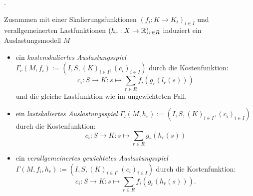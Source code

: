 \begin{bsp}.
	
\end{bsp}

\begin{defn}\label{def:skalierteAuslastungsspiel}
	Zusammen mit einer Skalierungsfunktionen $(f_i: K \to K_i)_{i\in I}$ und verallgemeinerten Lastfunktionen $(h_r: X \to \mathbb{R})_{r\in R}$ induziert ein Auslastungsmodell $M$ 
	\begin{itemize}
		\item ein \emph{kostenskaliertes Auslastungsspiel} $\Gamma_c(M, f_i) := (I, S, (K)_{i\in I}, (c_i)_{i \in I})$ durch die Kostenfunktion:
		\[c_i: S \to K: s \mapsto \sum_{r \in R} f_i(g_r(l_r(s))) \]
		und die gleiche Lastfunktion wie im ungewichteten Fall.
		\item ein \emph{lastskaliertes Auslastungsspiel} $\Gamma_l(M, h_r) := (I, S, (K)_{i\in I}, (c_i)_{i \in I})$ durch die Kostenfunktion:
		\[c_i: S \to K: s \mapsto \sum_{r \in R} g_r(h_r(s)) \]
		\item ein \emph{verallgemeinertes gewichtetes Auslastungsspiel} $\Gamma(M, f_i, h_r) := (I, S, (K)_{i\in I}, (c_i)_{i \in I})$ durch die Kostenfunktion:
		\[c_i: S \to K: s \mapsto \sum_{r \in R} f_i(g_r(h_r(s))).\]
	\end{itemize}	
\end{defn}